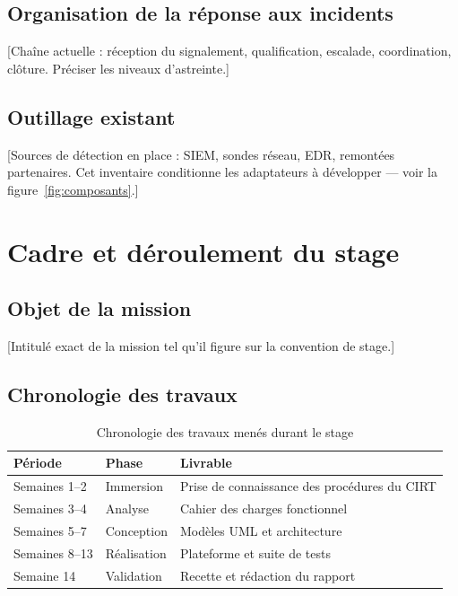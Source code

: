 \subsection{Organisation de la r\'eponse aux incidents}
[Cha\^ine actuelle : r\'eception du signalement, qualification, escalade,
coordination, cl\^oture. Pr\'eciser les niveaux d'astreinte.]

\subsection{Outillage existant}
[Sources de d\'etection en place : SIEM, sondes r\'eseau, EDR, remont\'ees
partenaires. Cet inventaire conditionne les adaptateurs \`a d\'evelopper --- voir
la figure~\ref{fig:composants}.]

\section{Cadre et d\'eroulement du stage}
\subsection{Objet de la mission}
[Intitul\'e exact de la mission tel qu'il figure sur la convention de stage.]

\subsection{Chronologie des travaux}
\begin{table}[H]
\centering
\caption{Chronologie des travaux men\'es durant le stage}
\label{tab:chronologie}
\begin{tabular}{@{}llp{7.5cm}@{}}
\toprule
\textbf{P\'eriode} & \textbf{Phase} & \textbf{Livrable} \\
\midrule
Semaines 1--2 & Immersion    & Prise de connaissance des proc\'edures du CIRT \\
Semaines 3--4 & Analyse      & Cahier des charges fonctionnel \\
Semaines 5--7 & Conception   & Mod\`eles UML et architecture \\
Semaines 8--13 & R\'ealisation & Plateforme et suite de tests \\
Semaine 14    & Validation   & Recette et r\'edaction du rapport \\
\bottomrule
\end{tabular}
\end{table}

